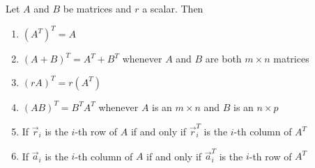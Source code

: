 \begin{proposition}
Let $A$ and $B$ be matrices and $r$ a scalar. Then 
\begin{enumerate}
\item $(A^T)^T=A$
\item $(A+B)^T=A^T+B^T$ whenever $A$ and $B$ are both $m \times n$ matrices
\item $(rA)^T=r(A^T)$
\item $(AB)^T=B^TA^T$ whenever $A$ is an $m \times n$ and $B$ is an $n \times p$
\item If $\vec{r}_i$ is the $i$-th row of $A$ if and only if $\vec{r}_i^T$ is the $i$-th column of $A^T$ 
\item If $\vec{a}_i$ is the $i$-th column of $A$ if and only if $\vec{a}_i^T$ is the $i$-th row of $A^T$ 
\end{enumerate}
\end{proposition}

